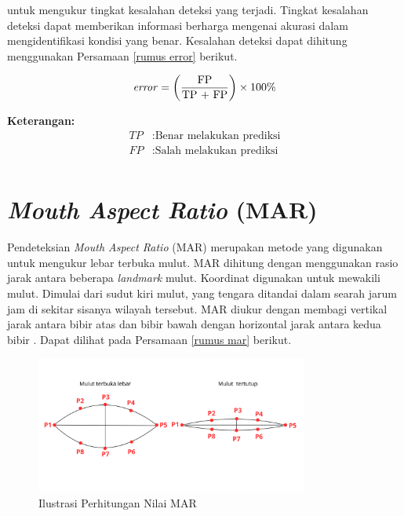      untuk mengukur tingkat kesalahan deteksi yang terjadi. Tingkat kesalahan deteksi dapat memberikan informasi berharga mengenai akurasi dalam mengidentifikasi kondisi yang benar. Kesalahan deteksi dapat dihitung menggunakan Persamaan \ref{rumus error} berikut.


    \begin{equation}
        \label{rumus error}
        \begin{aligned}
        \text{\textit{error}} = \left(\frac{\text{FP}}{\text{TP + FP}}\right) \times 100\%
        \end{aligned}
    \end{equation}

       \textbf{Keterangan:}
      \begin{align*}
        TP & : \text{Benar melakukan prediksi} \\
        FP & : \text{Salah melakukan prediksi} \\
    \end{align*}

   

\section{\textit{Mouth Aspect Ratio} (MAR)}

Pendeteksian \textit{Mouth Aspect Ratio} (MAR) merupakan metode yang digunakan untuk mengukur lebar terbuka mulut. MAR dihitung dengan menggunakan rasio jarak antara beberapa \textit{landmark} mulut. Koordinat digunakan untuk mewakili mulut. Dimulai dari
sudut kiri mulut, yang tengara ditandai dalam searah jarum jam di sekitar sisanya
wilayah tersebut. MAR diukur dengan membagi vertikal jarak antara bibir atas dan bibir bawah dengan horizontal jarak antara kedua bibir \cite{inproceedings, jimaging9050091}. Dapat dilihat pada Persamaan \ref{rumus mar} berikut.


    \begin{figure}[H]
      \centering
      \includegraphics[width=0.8\textwidth]{figures/bab2/mar.png}
      \caption{Ilustrasi Perhitungan Nilai MAR}
      \label{Ilustrasi Perhitungan Nilai MAR}
    \end{figure}


